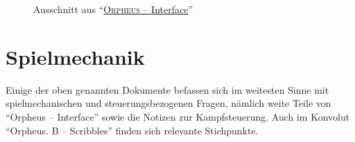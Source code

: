 \documentclass[a5paper,pagesize]{scrbook}
\begin{document}
\vfill
\begin{figure}[p]
   \centering
   \caption{Ausschnitt aus \enquote{\uline{\textsc{Orpheus} -- Interface}}}
   \label{fig:orpheus_inventar}
\end{figure}


\section{Spielmechanik}\label{sec:orpheus_mechanik}
Einige der oben genannten Dokumente befassen sich im weitesten Sinne mit spielmechanischen und steuerungsbezogenen Fragen, nämlich weite Teile von \enquote{Orpheus -- Interface} sowie die Notizen zur Kampfsteuerung.
Auch im Konvolut \enquote{Orpheus. B -- Scribbles} finden sich relevante Stichpunkte.
\end{document}
